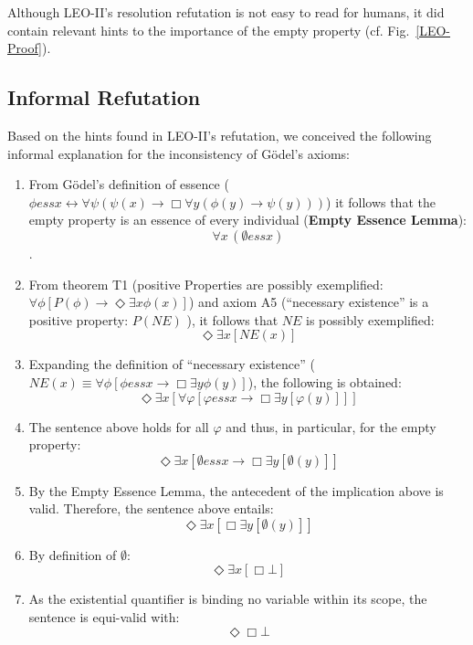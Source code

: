 \documentclass{article}
\newcommand{\imp}{\rightarrow}
\newcommand{\biimp}{\leftrightarrow}
\newcommand{\allq}{\forall}
\newcommand{\exq}{\exists}
\newcommand{\Dia}{\Diamond} %
\newcommand{\NE}{\mathit{NE}}
\newcommand{\ess}[2]{#1 \mathit{ess} #2}
\newcommand{\nec}{\Box}
\newcommand{\pos}{\Dia}
\begin{document}
Although LEO-II's resolution refutation is not easy to read for humans, it did contain
relevant hints to the importance of the empty property (cf. Fig.~\ref{LEO-Proof}).


\subsection{Informal Refutation}

Based on the hints found in LEO-II's refutation, we conceived the following informal explanation for the inconsistency of G\"odel's axioms:

\begin{enumerate}
\item From G\"odel's definition of essence 
(${\ess{\phi}{x} \biimp {\allq \psi} (\psi(x)
\imp {\nec} \allq y (\phi(y) \imp \psi(y)))}$) it follows that the empty property is an essence of every individual (\textbf{Empty Essence Lemma}): 
$$\allq x\,(\ess{\emptyset}{x})$$. 

\item From theorem T1 (positive Properties are possibly
  exemplified: ${\allq \phi} [P(\phi) \imp {\pos}  \exq x
  \phi(x)]$) and axiom A5 (``necessary existence'' is a positive property: $P(\NE)$ ), it follows that $\NE$ is possibly exemplified:
  $$
  \pos \exq x [\NE(x)]
  $$
 
\item Expanding the definition of ``necessary existence'' ( 
  ${\NE(x) \equiv \allq
  \phi [\ess{\phi}{x} \imp \nec
  \exq y \phi(y)]}$), the following is obtained:
  $$
  \pos \exq x [\allq \varphi [ \ess{\varphi}{x} \imp \nec \exq y [\varphi(y)] ] ]
  $$

\item The sentence above holds for all $\varphi$ and thus, in particular, for the empty property:
$$
\pos \exq x [ \ess{\emptyset}{x} \imp \nec \exq y [\emptyset(y)] ]
$$

\item By the Empty Essence Lemma, the antecedent of the implication above is valid. Therefore, the sentence above entails:
$$
\pos \exq x [ \nec \exq y [\emptyset(y)] ]
$$ 

\item By definition of $\emptyset$: 
$$
\pos \exq x [ \nec \bot ]
$$

\item As the existential quantifier is binding no variable within its scope, the sentence is equi-valid with:
$$\pos \nec \bot $$


\end{enumerate}
\end{document}
